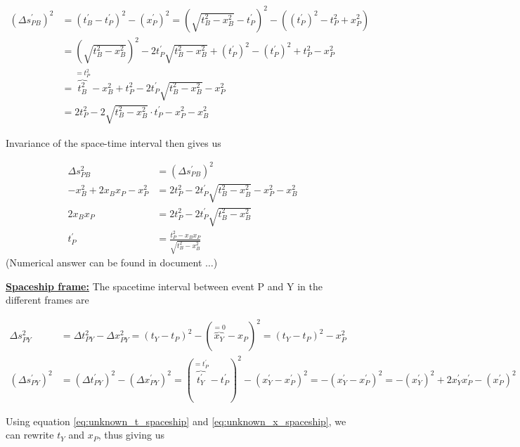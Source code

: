 \documentclass[a4paper,10pt,english]{article}
\begin{document}
\begin{enumerate}
\begin{enumerate}
\begin{align*}
(\Delta s_{PB}^{\prime})^2&=(t_{B}^{\prime}-t^{\prime}_{P})^2-(x^{\prime}_{P})^2=\left(\sqrt{t_{B}^2-x_{B}^2}-t^{\prime}_{P}\right)^2-\left((t^{\prime}_{P})^{2}-t_{P}^{2}+x_{P}^{2}\right)\\
&=\left(\sqrt{t_{B}^2-x_{B}^2}\right)^2-2t^{\prime}_{P}\sqrt{t_{B}^2-x_{B}^2}+(t^{\prime}_{P})^2-(t^{\prime}_{P})^{2}+t_{P}^{2}-x_{P}^{2}\\
&=\overbrace{t_{B}^2}^{=t_{P}^2}-x_{B}^2+t_{P}^{2}-2t^{\prime}_{P}\sqrt{t_{B}^2-x_{B}^2}-x_{P}^{2}\\
&=2t_{P}^{2}-2\sqrt{t_{B}^2-x_{B}^2}\cdot t^{\prime}_{P}-x_{P}^{2}-x_{B}^2
\end{align*}

Invariance of the space-time interval then gives us

\begin{align}
\Delta s_{PB}^2&=(\Delta s_{PB}^{\prime})^2 \nonumber\\
-x_{B}^2+2x_{B}x_{P}-x_{P}^2&=2t_{P}^{2}-2t^{\prime}_{P}\sqrt{t_{B}^2-x_{B}^2}-x_{P}^{2}-x_{B}^2 \nonumber\\
2x_{B}x_{P}&=2t_{P}^{2}-2t^{\prime}_{P}\sqrt{t_{B}^2-x_{B}^2} \nonumber\\
t^{\prime}_{P}&=\frac{t_{P}^{2}-x_{B}x_{P}}{\sqrt{t_{B}^2-x_{B}^2}} \label{eq:t_prime_p}
\end{align}
(Numerical answer can be found in document $\ldots$)

\underline{\bf{Spaceship frame:}} The spacetime interval between event P and Y in the different frames are

\begin{align*}
\Delta s_{PY}^2&=\Delta t_{PY}^2-\Delta x_{PY}^2=(t_{Y}-t_{P})^2-(\overbrace{x_{Y}}^{=0}-x_{P})^2=(t_{Y}-t_{P})^2-x_{P}^2\\
(\Delta s_{PY}^{\prime})^2&=(\Delta t_{PY}^{\prime})^2-(\Delta x_{PY}^{\prime})^2=(\overbrace{t_{Y}^{\prime}}^{=t^{\prime}_{P}}-t^{\prime}_{P})^2-(x_{Y}^{\prime}-x^{\prime}_{P})^2=-(x_{Y}^{\prime}-x^{\prime}_{P})^2=-(x_{Y}^{\prime})^2+2x_{Y}^{\prime}x^{\prime}_{P}-(x^{\prime}_{P})^2
\end{align*}

Using equation \ref{eq:unknown_t_spaceship} and \ref{eq:unknown_x_spaceship}, we can rewrite $t_{Y}$ and $x_{P}$, thus giving us 


\end{enumerate}
\end{enumerate}
\end{document}
